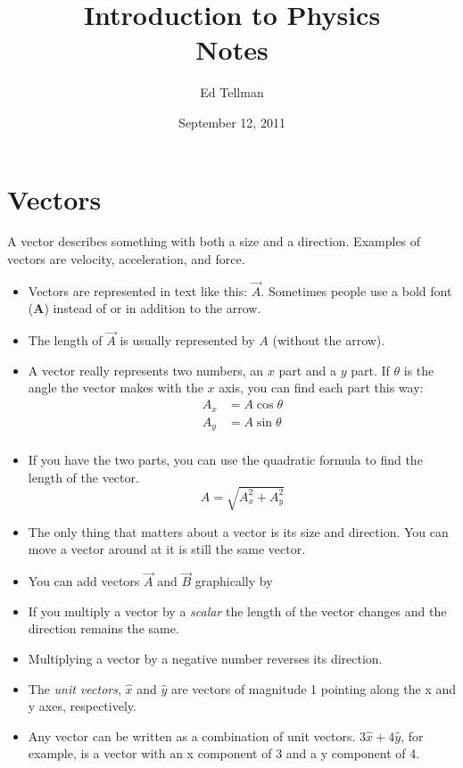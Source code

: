 \documentclass{article}
\title{Introduction to Physics \\ Notes}
\date{September 12, 2011}
\author{Ed Tellman}
\begin{document}
\maketitle

\section{Vectors}
A vector describes something with both a size and a direction.  Examples of vectors are velocity, acceleration, and force.
\begin{itemize} 
  \item Vectors are represented in text like this: $\vec{A}$.  Sometimes people use a bold font ($\mathbf{A}$) instead
    of or in addition to the arrow.
  \item The length of $\vec{A}$ is usually represented by $A$ (without the arrow).
  \item A vector really represents two numbers, an $x$ part and a $y$ part.  If $\theta$ is the angle the vector makes
    with the $x$ axis, you can find each part this way: 
    \begin{align*}
      A_x &= A \cos \theta \\
      A_y &= A \sin \theta \\
    \end{align*}
  \item If you have the two parts, you can use the quadratic formula to find the length of the vector.  \[A = \sqrt{A_x^2 + A_y^2}\]
  \item The only thing that matters about a vector is its size and direction.  You can move a vector around at it is still the same vector.
  \item You can add vectors $\vec{A}$ and $\vec{B}$ graphically by
  \item If you multiply a vector by a {\em scalar} the length of the vector changes and the direction remains the same.
  \item Multiplying a vector by a negative number reverses its direction.
  \item The {\em unit vectors}, $\hat{x}$ and $\hat{y}$ are vectors of magnitude 1 pointing along the x and y axes, respectively.
  \item Any vector can be written as a combination of unit vectors.  $3 \hat{x} + 4 \hat{y}$, for example, is a vector
    with an x component of 3 and a y component of 4.
\end{itemize} 
\end{document}
